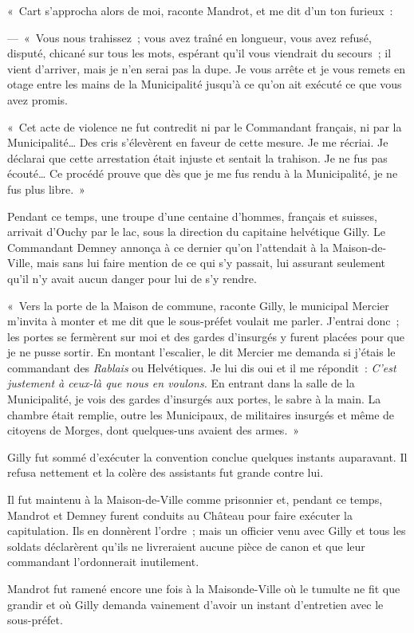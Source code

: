 \documentclass[french,twoside]{book} %
\newenvironment{quoteblock}%
  {\begin{quoting}}
  {\end{quoting}}
\newenvironment{quotebar}{%
    \def\FrameCommand{{\color{rubric!10!}\vrule width 0.5em} \hspace{0.9em}}%
    \def\OuterFrameSep{\itemsep} %
    \MakeFramed {\advance\hsize-\width \FrameRestore}
  }%
  {%
    \endMakeFramed
  }
\renewenvironment{quoteblock}%
  {%
    \savenotes
    \setstretch{0.9}
    \normalfont
    \begin{quotebar}
  }
  {%
    \end{quotebar}
    \spewnotes
  }
\begin{document}
\begin{quoteblock}
 \noindent « Cart s’approcha alors de moi, raconte Mandrot, et me dit d’un ton furieux :\par
 — « Vous nous trahissez ; vous avez traîné en longueur, vous avez refusé, disputé, chicané sur tous les mots, espérant qu’il vous viendrait du secours ; il vient d’arriver, mais je n’en serai pas la dupe. Je vous arrête et je vous remets en otage entre les mains de la Municipalité jusqu’à ce qu’on ait exécuté ce que vous avez promis.\par
 « Cet acte de violence ne fut contredit ni par le Commandant français, ni par la Municipalité… Des cris s’élevèrent en faveur de cette mesure. Je me récriai. Je déclarai que cette arrestation était injuste et sentait la trahison. Je ne fus pas écouté… Ce procédé prouve que dès que je me fus rendu à la Municipalité, je ne fus plus libre. »
 \end{quoteblock}

\noindent Pendant ce temps, une troupe d’une centaine d’hommes, français et suisses, arrivait d’Ouchy par le lac, sous la direction du capitaine helvétique Gilly. Le Commandant Demney annonça à ce dernier qu’on l’attendait à la Maison-de-Ville, mais sans lui faire mention de ce qui s’y passait, lui assurant seulement qu’il n’y avait aucun danger pour lui de s’y rendre.\par

\begin{quoteblock}
 \noindent « Vers la porte de la Maison de commune, raconte Gilly, le municipal Mercier m’invita à monter et me dit que le sous-préfet voulait me parler. J’entrai donc ; les portes se fermèrent sur moi et des gardes d’insurgés y furent placées pour que je ne pusse sortir. En montant l’escalier, le dit Mercier me demanda si j’étais le commandant des \emph{Rablais} ou Helvétiques. Je lui dis oui et il me répondit : \emph{C’est justement à ceux-là que nous en voulons.} En entrant dans la salle de la Municipalité, je vois des gardes d’insurgés aux portes, le sabre à la main. La chambre était remplie, outre les Municipaux, de militaires insurgés et même de citoyens de Morges, dont quelques-uns avaient des armes. »
 \end{quoteblock}

\noindent Gilly fut sommé d’exécuter la convention conclue quelques instants auparavant. Il refusa nettement et la colère des assistants fut grande contre lui.\par
Il fut maintenu à la Maison-de-Ville comme prisonnier et, pendant ce temps, Mandrot et Demney furent conduits au Château pour faire exécuter la capitulation. Ils en donnèrent l’ordre ; mais un officier venu avec Gilly et tous les soldats déclarèrent qu’ils ne livreraient aucune pièce de canon et que leur commandant l’ordonnerait inutilement.\par
Mandrot fut ramené encore une fois à la Maisonde-Ville où le tumulte ne fit que grandir et où Gilly demanda vainement d’avoir un instant d’entretien avec le sous-préfet.\par
\end{document}
